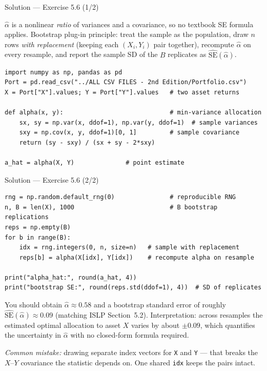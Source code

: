 \documentclass[aspectratio=169,11pt]{beamer}
\begin{document}
\begin{frame}[fragile]{Solution --- Exercise 5.6 (1/2)}
  \begin{solutionbox}
    $\hat\alpha$ is a nonlinear \emph{ratio} of variances and a
    covariance, so no textbook SE formula applies. Bootstrap plug-in
    principle: treat the sample as the population, draw $n$ rows
    \emph{with replacement} (keeping each $(X_i, Y_i)$ pair together),
    recompute $\hat\alpha$ on every resample, and report the sample SD
    of the $B$ replicates as $\widehat{\mathrm{SE}}(\hat\alpha)$.
  \end{solutionbox}
  \begin{lstlisting}
import numpy as np, pandas as pd
Port = pd.read_csv("../ALL CSV FILES - 2nd Edition/Portfolio.csv")
X = Port["X"].values; Y = Port["Y"].values   # two asset returns

def alpha(x, y):                             # min-variance allocation
    sx, sy = np.var(x, ddof=1), np.var(y, ddof=1)  # sample variances
    sxy = np.cov(x, y, ddof=1)[0, 1]         # sample covariance
    return (sy - sxy) / (sx + sy - 2*sxy)

a_hat = alpha(X, Y)              # point estimate
  \end{lstlisting}
\end{frame}

\begin{frame}[fragile]{Solution --- Exercise 5.6 (2/2)}
  \begin{lstlisting}
rng = np.random.default_rng(0)               # reproducible RNG
n, B = len(X), 1000                          # B bootstrap replications
reps = np.empty(B)
for b in range(B):
    idx = rng.integers(0, n, size=n)   # sample with replacement
    reps[b] = alpha(X[idx], Y[idx])    # recompute alpha on resample

print("alpha_hat:", round(a_hat, 4))
print("bootstrap SE:", round(reps.std(ddof=1), 4))  # SD of replicates
  \end{lstlisting}
  \begin{solutionbox}
    You should obtain $\hat\alpha \approx 0.58$ and a bootstrap standard
    error of roughly $\widehat{\mathrm{SE}}(\hat\alpha) \approx 0.09$
    (matching ISLP Section~5.2). Interpretation: across resamples the
    estimated optimal allocation to asset $X$ varies by about $\pm 0.09$,
    which quantifies the uncertainty in $\hat\alpha$ with no closed-form
    formula required.

    \emph{Common mistake:} drawing separate index vectors for \texttt{X}
    and \texttt{Y} --- that breaks the $X$--$Y$ covariance the statistic
    depends on. One shared \texttt{idx} keeps the pairs intact.
  \end{solutionbox}
\end{frame}
\end{document}
